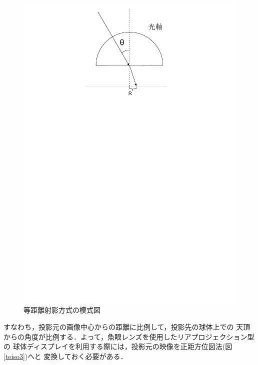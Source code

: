 \begin{figure}[tp]
  \centering
  \includegraphics[scale=0.7]{fig/projection2.pdf}
  \caption{等距離射影方式の模式図}\label{pro}
\end{figure}

すなわち，投影元の画像中心からの距離に比例して，投影先の球体上での
天頂からの角度が比例する．よって，魚眼レンズを使用したリアプロジェクション型の
球体ディスプレイを利用する際には，投影元の映像を正距方位図法(図\ref{teiso3})へと
変換しておく必要がある．

